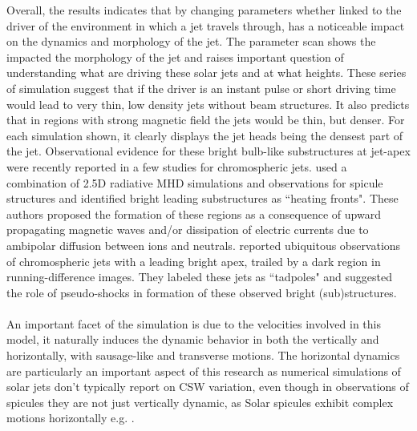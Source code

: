 \documentclass[12pt]{ociamthesis}
\newcommand{\np}{\\ \\}
\begin{document}
Overall, the results indicates that by changing parameters whether linked to the driver of the environment in which a jet travels through, has a noticeable impact on the dynamics and morphology of the jet. The parameter scan shows the impacted the morphology of the jet and raises important question of understanding what are driving these solar jets and at what heights. These series of simulation suggest that if the driver is an instant pulse or short driving time would lead to very thin, low density jets without beam structures. It also predicts that in regions with strong magnetic field the jets would be thin, but denser. For each simulation shown, it clearly displays the jet heads being the densest part of the jet. Observational evidence for these bright bulb-like substructures at jet-apex were recently reported in a few studies \citep{depontieu2017, srivastava2018NatAs} for chromospheric jets. \citet{depontieu2017} used a combination of 2.5D radiative MHD simulations and observations for spicule structures and identified bright  leading substructures as ``heating fronts". These authors proposed the formation of these regions as a consequence of upward propagating magnetic waves and/or dissipation of electric currents due to ambipolar diffusion between ions and neutrals. \citet{srivastava2018NatAs} reported ubiquitous observations of chromospheric jets with a leading bright apex, trailed by a dark region in running-difference images. They labeled these jets as ``tadpoles" and suggested the role of pseudo-shocks in formation of these observed bright (sub)structures. \np 
%
An important facet of the simulation is due to the velocities involved in this model, it naturally induces the dynamic behavior in both the vertically and horizontally, with sausage-like and transverse motions. The horizontal dynamics are particularly an important aspect of this research as numerical simulations of solar jets don't typically report on CSW variation, even though in observations of spicules they are not just vertically dynamic, as Solar spicules exhibit complex motions horizontally e.g. \citep{Sharma2018ApJ85361S,Antolin2018ApJ85644A}.
\end{document}
